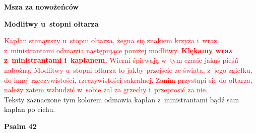 
\begin{center}
\Large

\textbf{Msza za nowożeńców}\\[0.3cm] 

\normalsize
\end{center}

\begin{center}
\large
\textbf{Modlitwy u~stopni ołtarza}
\normalsize

\textcolor{red}{Kapłan stanąwszy u~stopni ołtarza, żegna się znakiem krzyża i~wraz z~ministrantami odmawia następujące poniżej modlitwy. \textbf{Klękamy wraz z~ministrantami i~kapłanem.} Wierni śpiewają w~tym czasie jakąś pieśń nabożną. Modlitwy u~stopni ołtarza to jakby przejście ze świata, z~jego zgiełku, do innej rzeczywistości, rzeczywistości sakralnej. Zanim przystąpi się do ołtarza, należy zatem wzbudzić w~sobie żal za grzechy i~przeprosić za nie.}\\
\textcolor{my-color}{ Teksty zaznaczone tym kolorem odmawia kapłan z~ministrantami bądź sam kapłan po cichu. }

\textbf{Psalm 42}
\end{center}

